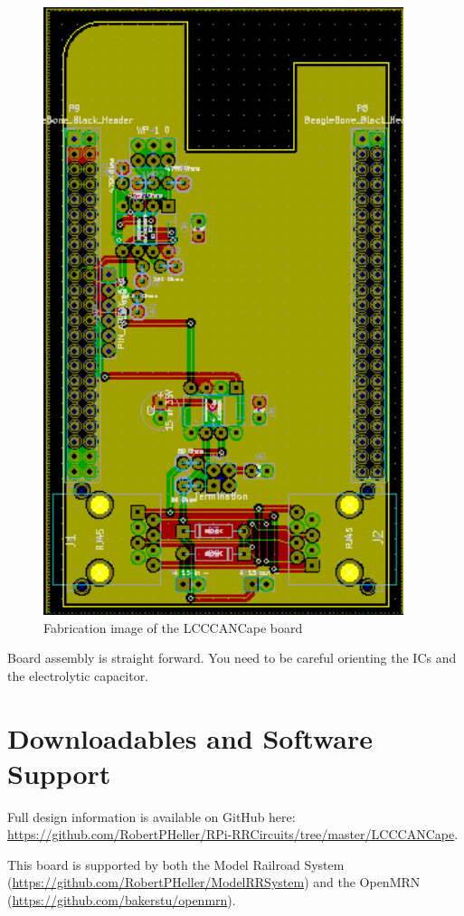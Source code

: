 \begin{figure}[hbpt]\begin{centering}%
\includegraphics[height=7in]{LCCCANCape.png}
\caption{Fabrication image of the LCCCANCape board}
\end{centering}\end{figure}
Board assembly is straight forward. You need to be careful orienting the ICs
and the electrolytic capacitor.


\section{Downloadables and Software Support}

Full design information is available on GitHub here:
\url{https://github.com/RobertPHeller/RPi-RRCircuits/tree/master/LCCCANCape}.

This board is supported by both the Model Railroad System 
(\url{https://github.com/RobertPHeller/ModelRRSystem}) and the OpenMRN 
(\url{https://github.com/bakerstu/openmrn}).
